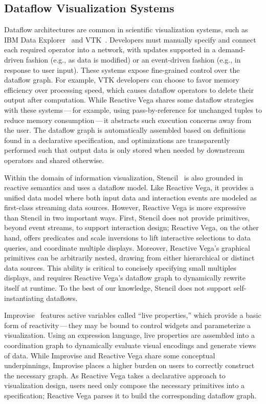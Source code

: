 \vspace{-10pt}

\subsection{Dataflow Visualization Systems}

Dataflow architectures are common in scientific visualization systems, such as
IBM Data Explorer~\cite{lucas:dataflow,abram:ibmdx} and
VTK~\cite{schroeder:vtk}. Developers must manually specify and connect each
required operator into a network, with updates supported in a demand-driven
fashion (e.g., as data is modified) or an event-driven fashion (e.g., in
response to user input). These systems expose fine-grained control over the
dataflow graph. For example, VTK developers can choose to favor memory
efficiency over processing speed, which causes dataflow operators to delete
their output after computation. While Reactive Vega shares some dataflow
strategies with these systems\,---\,for example, using pass-by-reference for
unchanged tuples to reduce memory consumption\,---\,it abstracts such execution
concerns away from the user. The dataflow graph is automatically assembled based
on definitions found in a declarative specification, and optimizations are
transparently performed such that output data is only stored when needed by
downstream operators and shared otherwise.

Within the domain of information visualization, Stencil~\cite{cottam:stencil} is
also grounded in reactive semantics and uses a dataflow model. Like Reactive
Vega, it provides a unified data model where both input data and interaction
events are modeled as first-class streaming data sources. However, Reactive Vega
is more expressive than Stencil in two important ways. First, Stencil does not
provide primitives, beyond event streams, to support interaction design;
Reactive Vega, on the other hand, offers predicates and scale inversions to lift
interactive selections to data queries, and coordinate multiple displays.
Moreover, Reactive Vega's graphical primitives can be arbitrarily nested,
drawing from either hierarchical or distinct data sources. This ability is
critical to concisely specifying small multiples displays, and requires Reactive
Vega's dataflow graph to dynamically rewrite itself at runtime. To the best of
our knowledge, Stencil does not support self-instantiating dataflows.

Improvise~\cite{weaver:improvise} features active variables called ``live
properties,'' which provide a basic form of reactivity\,---\,they may be bound
to control widgets and parameterize a visualization. Using an expression
language, live properties are assembled into a coordination graph to dynamically
evaluate visual encodings and generate views of data. While Improvise and
Reactive Vega share some conceptual underpinnings, Improvise places a higher
burden on users to correctly construct the necessary graph. As Reactive Vega
takes a declarative approach to visualization design, users need only compose
the necessary primitives into a specification; Reactive Vega parses it to build
the corresponding dataflow graph.

